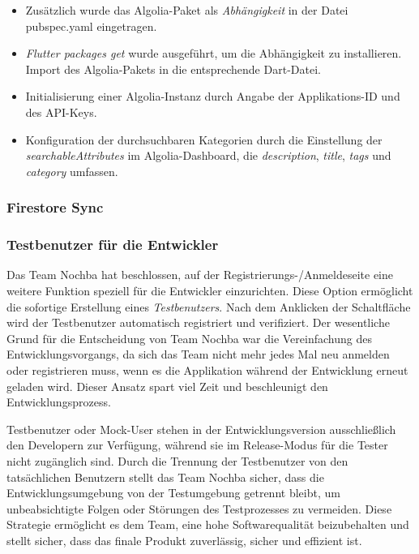 \begin{itemize}
  \item {Zusätzlich wurde das Algolia-Paket als \textit{Abhängigkeit} in der Datei pubspec.yaml eingetragen.}
  \item {\textit{Flutter packages get} wurde ausgeführt, um die Abhängigkeit zu installieren.
        Import des Algolia-Pakets in die entsprechende Dart-Datei.}
  \item {Initialisierung einer Algolia-Instanz durch Angabe der Applikations-ID und des API-Keys.}
  \item {Konfiguration der durchsuchbaren Kategorien durch die Einstellung der \textit{searchableAttributes} im Algolia-Dashboard, die \textit{description}, \textit{title}, \textit{tags} und \textit{category} umfassen.}
\end{itemize}

\subsubsection{Firestore Sync}

\subsubsection{Testbenutzer für die Entwickler}

Das Team Nochba hat beschlossen, auf der Registrierungs-/Anmeldeseite eine weitere Funktion speziell für die Entwickler einzurichten. Diese Option ermöglicht die sofortige Erstellung eines \textit{Testbenutzers}. Nach dem Anklicken der Schaltfläche wird der Testbenutzer automatisch registriert und verifiziert. Der wesentliche Grund für die Entscheidung von Team Nochba war die Vereinfachung des Entwicklungsvorgangs, da sich das Team nicht mehr jedes Mal neu anmelden oder registrieren muss, wenn es die Applikation während der Entwicklung erneut geladen wird. Dieser Ansatz spart viel Zeit und beschleunigt den Entwicklungsprozess.

Testbenutzer oder Mock-User stehen in der Entwicklungsversion ausschließlich den Developern zur Verfügung, während sie im Release-Modus für die Tester nicht zugänglich sind. Durch die Trennung der Testbenutzer von den tatsächlichen Benutzern stellt das Team Nochba sicher, dass die Entwicklungsumgebung von der Testumgebung getrennt bleibt, um unbeabsichtigte Folgen oder Störungen des Testprozesses zu vermeiden. Diese Strategie ermöglicht es dem Team, eine hohe Softwarequalität beizubehalten und stellt sicher, dass das finale Produkt zuverlässig, sicher und effizient ist.

